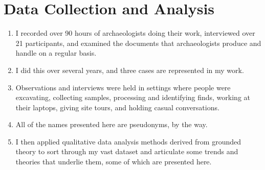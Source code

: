 \documentclass{article}
\begin{document}
\section{Data Collection and Analysis}
\begin{enumerate}
  \item I recorded over 90 hours of archaeologists doing their work, interviewed over 21 participants, and examined the documents that archaeologists produce and handle on a regular basis.
  \item I did this over several years, and three cases are represented in my work.
  \item Observations and interviews were held in settings where people were excavating, collecting samples, processing and identifying finds, working at their laptops, giving site tours, and holding casual conversations.
  \item All of the names presented here are pseudonyms, by the way.
  \item I then applied qualitative data analysis methods derived from grounded theory to sort through my vast dataset and articulate some trends and theories that underlie them, some of which are presented here.
\end{enumerate}
\end{document}
